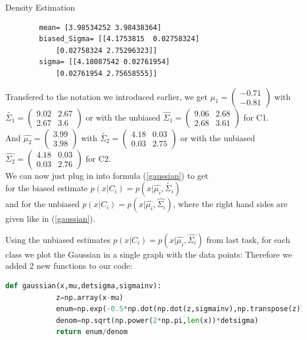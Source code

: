 \documentclass[
ngerman,
]{tudaexercise}
\begin{document}
\begin{task}{Density Estimation}
\begin{subtask}
\begin{lstlisting}
		mean= [3.98534252 3.98438364]
		biased_Sigma= [[4.1753815  0.02758324]
			[0.02758324 2.75296323]]
		sigma= [[4.18087542 0.02761954]
			[0.02761954 2.75658555]]
		\end{lstlisting}
		Transfered to the notation we introduced earlier, we get $\hat{\mu_1}=\begin{pmatrix}
		-0.71\\-0.81
		\end{pmatrix}$ with $\tilde{\Sigma_1}=\begin{pmatrix}
		9.02 & 2.67\\2.67 & 3.6
		\end{pmatrix}$ or with the unbiased $\hat{\Sigma_1}=\begin{pmatrix}9.06&2.68\\2.68&3.61
		\end{pmatrix}$ for C1.\\ And $\hat{\mu_2}=\begin{pmatrix}
		3.99\\3.98
		\end{pmatrix}$ with $\tilde{\Sigma_2}=\begin{pmatrix}
		4.18&0.03\\0.03&2.75
		\end{pmatrix}$ or with the unbiased $\hat{\Sigma_2}=\begin{pmatrix}		4.18&0.03\\0.03&2.76
		\end{pmatrix}$ for C2.\\
		We can now just plug in into formula (\ref{gaussian}) to get \\for the biased estimate $p(x|C_i)=p(x|\hat{\mu_i},\tilde{\Sigma_i})$ \\and for the unbiased $p(x|C_i)=p(x|\hat{\mu_i},\hat{\Sigma_i})$, where the right hand sides are given like in (\ref{gaussian}).
	\end{subtask}
\begin{subtask}
	Using the unbiased estimates $p(x|C_i)=p(x|\hat{\mu_i},\hat{\Sigma_i})$ from last task, for each class we plot the Gaussian in a single graph with the data points: Therefore we added 2 new functions to our code:
	\begin{lstlisting}[language=Python]
		def gaussian(x,mu,detsigma,sigmainv):
			z=np.array(x-mu)
			enum=np.exp(-0.5*np.dot(np.dot(z,sigmainv),np.transpose(z)))
			denom=np.sqrt(np.power(2*np.pi,len(x))*detsigma)
			return enum/denom
		

\end{lstlisting}
\end{subtask}
\end{task}
\end{document}
